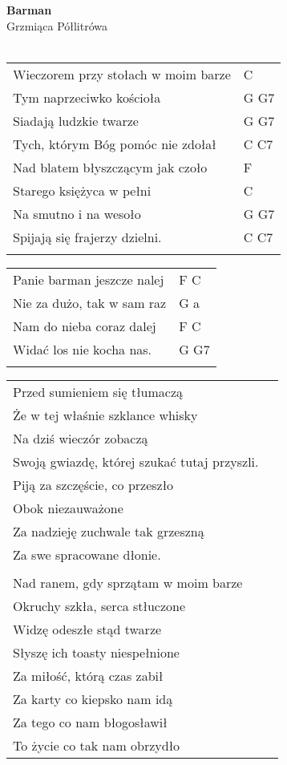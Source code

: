 \documentclass[a5paper]{article}
\begin{document}


\noindent
\fontsize{12pt}{15pt}\selectfont
\textbf{Barman} \\
\fontsize{8pt}{10pt}\selectfont
Grzmiąca Półlitrówa \\ \\
\fontsize{10pt}{12pt}\selectfont
{}
\begin{tabular}{@{}p{9cm}p{3cm}@{}}
\noindent
Wieczorem przy stołach w moim barze & C \\
Tym naprzeciwko kościoła & G G7 \\
Siadają ludzkie twarze & G G7 \\
Tych, którym Bóg pomóc nie zdołał & C C7 \\
Nad blatem błyszczącym jak czoło & F \\
Starego księżyca w pełni & C \\
Na smutno i na wesoło & G G7 \\
Spijają się frajerzy dzielni. & C C7 \\ \\
\end{tabular}

\noindent
\begin{tabular}{@{}p{8cm}p{3cm}@{}}
Panie barman jeszcze nalej & F C \\
Nie za dużo, tak w sam raz & G a \\
Nam do nieba coraz dalej & F C \\
Widać los nie kocha nas. & G G7 \\ \\
\end{tabular}

\noindent
\begin{tabular}{@{}p{8.5cm}p{3cm}@{}}
Przed sumieniem się tłumaczą \\
Że w tej właśnie szklance whisky \\
Na dziś wieczór zobaczą \\
Swoją gwiazdę, której szukać tutaj przyszli.\\
Piją za szczęście, co przeszło\\
Obok niezauważone\\
Za nadzieję zuchwale tak grzeszną\\
Za swe spracowane dłonie.\\\\

Nad ranem, gdy sprzątam w moim barze\\
Okruchy szkła, serca stłuczone\\
Widzę odeszłe stąd twarze\\
Słyszę ich toasty niespełnione\\
Za miłość, którą czas zabił\\
Za karty co kiepsko nam idą\\
Za tego co nam błogosławił\\
To życie co tak nam obrzydło
\end{tabular}
\end{document}
